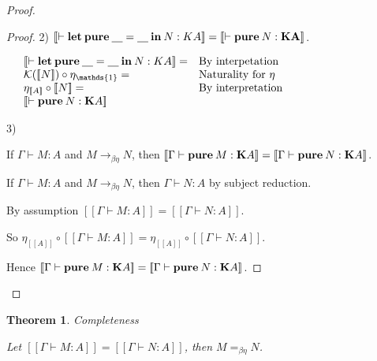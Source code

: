 \documentclass[a4paper]{article}
\newtheorem{theorem}{Theorem}
\begin{document}
\begin{proof}
\begin{proof}
2) $[\![\vdash {\bf let \: pure \:} \underline{\quad} = \underline{\quad} {\: \bf in \:} N : {\bf }K A ]\!] = [\![\vdash {\bf pure \:} N : {\bf K A}]\!]$.

\vspace{\baselineskip}

$\begin{array}{lll}
&[\![\vdash {\bf let \: pure \:} \underline{\quad} = \underline{\quad} {\: \bf in \:} N : {\bf }K A ]\!] = & \text{By interpetation}\\
&\mathcal{K}([\![N]\!]) \circ \eta_{\mathds{1}} =& \text{Naturality for $\eta$} \\
&\eta_{[\![A]\!]} \circ [\![N]\!] =& \text{By interpretation} \\
&[\![\vdash {\bf pure \:} N : {\bf K} A]\!]&
\end{array}$

\vspace{\baselineskip}

3)

If $\Gamma \vdash M : A$ and $M \rightarrow_{\beta \eta} N$, then $[\![\Gamma \vdash {\bf pure \:} M : {\bf K}A]\!] = [\![\Gamma \vdash {\bf pure \:} N : {\bf K}A]\!]$.

\vspace{\baselineskip}

If $\Gamma \vdash M : A$ and $M \rightarrow_{\beta \eta} N$, then $\Gamma \vdash N : A$ by subject reduction.

By assumption $[\![\Gamma \vdash M : A]\!] = [\![\Gamma \vdash N : A]\!]$.

So $\eta_{[\![A]\!]} \circ [\![\Gamma \vdash M : A]\!] = \eta_{[\![A]\!]} \circ [\![\Gamma \vdash N : A]\!]$.

Hence $[\![\Gamma \vdash {\bf pure \:} M : {\bf K}A]\!] = [\![\Gamma \vdash {\bf pure \:} N : {\bf K}A]\!]$.

\end{proof}

\end{proof}

\begin{theorem} Completeness

Let $[\![\Gamma \vdash M : A]\!] = [\![\Gamma \vdash N : A]\!]$, then $M =_{\beta \eta} N$.
\end{theorem}
\end{document}
